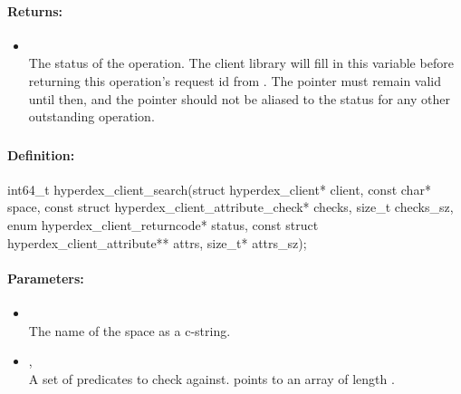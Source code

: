 \paragraph{Returns:}
\begin{itemize}[noitemsep]
\item {}\\
The status of the operation.  The client library will fill in this variable before returning this operation's request id from .  The pointer must remain valid until then, and the pointer should not be aliased to the status for any other outstanding operation.
\end{itemize}

\pagebreak
\subsubsection{}
\label{api:c:search}


\paragraph{Definition:}
\begin{ccode}
int64_t hyperdex_client_search(struct hyperdex_client* client,
        const char* space,
        const struct hyperdex_client_attribute_check* checks, size_t checks_sz,
        enum hyperdex_client_returncode* status,
        const struct hyperdex_client_attribute** attrs, size_t* attrs_sz);
\end{ccode}

\paragraph{Parameters:}
\begin{itemize}[noitemsep]
\item {}\\
The name of the space as a c-string.
\item {}, \\
A set of predicates to check against.   points to an array of length .
\end{itemize}

